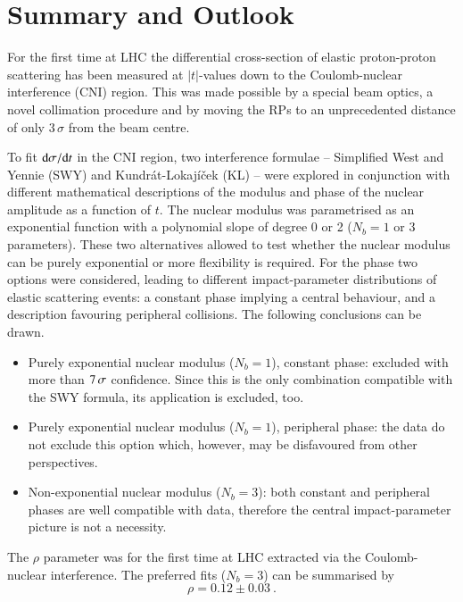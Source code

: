 \section{Summary and Outlook}
\label{sec:summary}
For the first time at LHC the differential cross-section of elastic proton-proton scattering has been measured at $|t|$-values down to the Coulomb-nuclear interference (CNI) region. This was made possible by a special beam optics, a novel collimation procedure and by moving the RPs to an unprecedented distance of only $3\,\sigma$ from the beam centre.

To fit ${\rm d}\sigma/{\rm d} t$ in the CNI region, two interference formulae -- Simplified West and Yennie (SWY) and Kundr\' at-Lokaj\' i\v cek (KL) -- 
were explored in conjunction with different mathematical descriptions of the modulus and phase of the nuclear amplitude as a function of $t$. The nuclear modulus was parametrised as an exponential function with a polynomial slope of degree 0 or 2 ($N_b=1$ or $3$ parameters). These two alternatives allowed to test whether the nuclear modulus can be purely exponential or more flexibility is required. For the phase two options were considered, leading to different impact-parameter distributions of elastic scattering events: a constant phase implying a central behaviour, and a description favouring peripheral collisions. The following conclusions can be drawn.
\begin{itemize}
\item Purely exponential nuclear modulus ($N_b=1$), constant phase: excluded with more than $7\,{\rm \sigma}$ confidence. Since this is the only combination compatible with the SWY formula, its application is excluded, too.
\item Purely exponential nuclear modulus ($N_b=1$), peripheral phase: the data do not exclude this option which, however, may be disfavoured from other perspectives.
\item Non-exponential nuclear modulus ($N_b=3$): both constant and peripheral phases are well compatible with data, therefore the central impact-parameter picture is not a necessity.
\end{itemize}

The $\rho$ parameter was for the first time at LHC extracted via the Coulomb-nuclear interference. The preferred fits ($N_b=3$) can be summarised by
\begin{equation}
\label{eq:rho final}
\rho = 0.12 \pm 0.03\ .
\end{equation}

